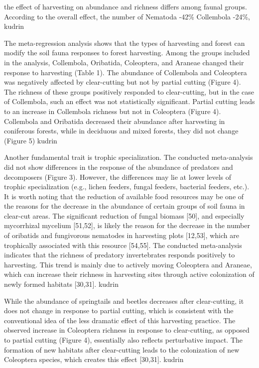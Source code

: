 the effect of harvesting on abundance and richness differs among faunal groups. According to the overall effect, the number of Nematoda -42\% Collembola -24\%, kudrin

The meta-regression analysis shows that the types of harvesting and forest can modify the soil fauna responses to forest harvesting. Among the groups included in the analysis, Collembola, Oribatida, Coleoptera, and Araneae changed their response to harvesting (Table 1). The abundance of Collembola and Coleoptera was negatively affected by clear-cutting but not by partial cutting (Figure 4). The richness of these groups positively responded to clear-cutting, but in the case of Collembola, such an effect was not statistically significant. Partial cutting leads to an increase in Collembola richness but not in Coleoptera (Figure 4). Collembola and Oribatida decreased their abundance after harvesting in coniferous forests, while in deciduous and mixed forests, they did not change (Figure 5) kudrin

Another fundamental trait is trophic specialization. The conducted meta-analysis did not show differences in the response of the abundance of predators and decomposers (Figure 3). However, the differences may lie at lower levels of trophic specialization (e.g., lichen feeders, fungal feeders, bacterial feeders, etc.). It is worth noting that the reduction of available food resources may be one of the reasons for the decrease in the abundance of certain groups of soil fauna in clear-cut areas. The significant reduction of fungal biomass [50], and especially mycorrhizal mycelium [51,52], is likely the reason for the decrease in the number of oribatids and fungivorous nematodes in harvesting plots [12,53], which are trophically associated with this resource [54,55]. The conducted meta-analysis indicates that the richness of predatory invertebrates responds positively to harvesting. This trend is mainly due to actively moving Coleoptera and Araneae, which can increase their richness in harvesting sites through active colonization of newly formed habitats [30,31]. kudrin 

While the abundance of springtails and beetles decreases after clear-cutting, it does not change in response to partial cutting, which is consistent with the conventional idea of the less dramatic effect of this harvesting practice. The observed increase in Coleoptera richness in response to clear-cutting, as opposed to partial cutting (Figure 4), essentially also reflects perturbative impact. The formation of new habitats after clear-cutting leads to the colonization of new Coleoptera species, which creates this effect [30,31]. kudrin


